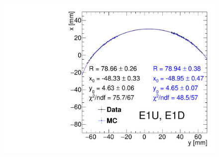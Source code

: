 \begin{figure}[ht]
{		\includegraphics[width=\linewidth,page=4]{graphics/rpSim/Apertures_swapedAxes_withFit.pdf}
	}%
\end{figure}


